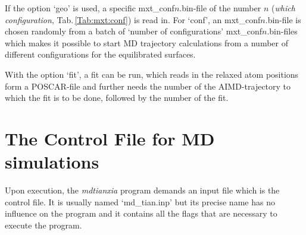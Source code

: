 \documentclass[twoside, 11pt, titlepage, captions=nooneline, a4paper, headsepline]{scrbook}%
\begin{document}
If the option `geo' is used, a specific mxt\_conf$n$.bin-file of the number $n$ (\textit{which configuration}, Tab.\,\ref{Tab:mxt:conf}) is read in. For `conf', an mxt\_conf$n$.bin-file is chosen randomly from a batch of `number of configurations' mxt\_conf$n$.bin-files which makes it possible to start MD trajectory calculations from a number of different configurations for the equilibrated surfaces.

With the option `fit', a fit can be run, which reads in the relaxed atom positions form a POSCAR-file and further needs the number of the AIMD-trajectory to which the fit is to be done, followed by the number of the fit.


\section{The Control File for MD simulations}
Upon execution, the \textit{mdtianxia} program demands an input file which is the control file. It is usually named `md\_tian.inp' but its precise name has no influence on the program and it contains all the flags that are necessary to execute the program.
\end{document}
